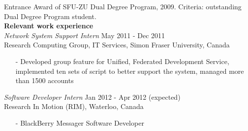 \documentclass{article}
\begin{document}
Entrance Award of SFU-ZU Dual Degree Program, 2009. Criteria: outstanding Dual Degree Program student. \\

{\bf Relevant work experience} \\

{\sl Network System Support Intern} \hfill May 2011 - Dec 2011 \\
Research Computing Group, IT Services, Simon Fraser University, Canada 
	\begin{itemize} 
	    \item[-] Developed group feature for Unified, Federated Development Service, implemented ten sets of script to better support the system, managed more than 1500 accounts
	\end{itemize}
	{\sl Software Developer Intern} \hfill Jan 2012 - Apr 2012 (expected)\\
	Research In Motion (RIM), Waterloo, Canada
	\begin{itemize} 
        \item[-] BlackBerry Messager Software Developer
	\end{itemize}
\end{document}
